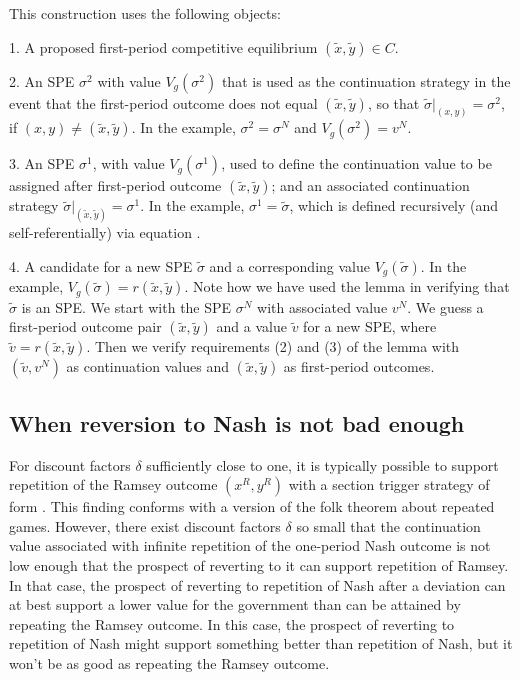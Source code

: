 This construction uses the following
objects:
\medskip
\item{1.} A proposed first-period competitive equilibrium $(\tilde x,\tilde y)\in C$.
\item{2.} An SPE $\sigma^2$ with value $V_g
(\sigma^2)$ that is used as the continuation strategy in the
event that the first-period outcome does not equal $(\tilde x,\tilde y)$,
so that $\tilde\sigma\vert_{(x,y)} = \sigma^2$, if $(x,y)\not=
(\tilde x,\tilde y)$.  In the example, $\sigma^2 = \sigma^N$ and
$V_g(\sigma^2) = v^N$.
\item{3.} An SPE $\sigma^1$, with value $V_g
(\sigma^1)$, used to define the continuation value to be assigned after
first-period outcome $(\tilde x,\tilde y)$;  and an associated  continuation strategy
$\tilde\sigma\vert_{(\tilde x,\tilde y)} = \sigma^1$.  In the
example, $\sigma^1 = \tilde \sigma$, which is defined recursively
(and self-referentially) via equation .
\item{4.} A candidate for a new  SPE  $\tilde\sigma$ and a corresponding value $V_g(\tilde \sigma)$.  In the example,
$V_g(\tilde \sigma) = r(\tilde x, \tilde y)$.
\medskip
Note how we have used the lemma in verifying that $\tilde \sigma$
is an SPE.  We start with the SPE $\sigma^N$ with associated value
$v^N$.  We guess a first-period outcome pair $(\tilde x, \tilde
y)$ and a value $\tilde v$ for a new SPE, where $\tilde v =
r(\tilde x, \tilde y)$. Then we verify requirements (2) and (3) of
the lemma with $(\tilde v, v^N)$ as continuation values and
$(\tilde x, \tilde y)$ as first-period outcomes.



\subsection{When reversion to Nash is not bad enough}

For discount factors $\delta$ sufficiently close to one, it is typically
 possible to support repetition of the Ramsey outcome
$(x^R, y^R)$ with a section  trigger strategy of  form  . This finding conforms
with a version
of the folk theorem about repeated games.  However,
there exist discount factors $\delta$ so small
that the continuation value associated with infinite   repetition of the one-period Nash
outcome is not low enough  that the prospect of reverting to it can support repetition of Ramsey.
In that case, the prospect of reverting 
to repetition of Nash after a deviation   can at best support
a lower value for the government  than can be attained by repeating the Ramsey outcome.
In this case, the prospect of reverting to repetition of Nash might  support something better than repetition of Nash, but it won't
be as good as repeating the  Ramsey outcome. %

